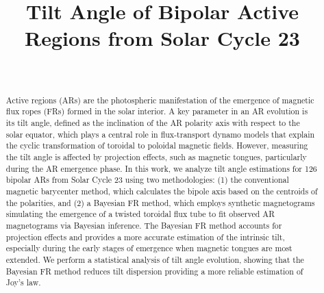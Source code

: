\documentclass[namedreferences,hyperref,optionalrh]{spr-sola}
\begin{document}
\begin{frontmatter}
\title{Tilt Angle of Bipolar Active Regions from Solar Cycle 23}

\author[addressref={aff1},email={mpoisson@iafe.uba.ar}]{~}
\address[id=aff1]{Instituto de Astronomía y Física del Espacio, CONICET-UBA,CABA, Argentina.}


\begin{abstract}

Active regions (ARs) are the photospheric manifestation of the emergence of magnetic flux ropes (FRs) formed in the solar interior. A key parameter in an AR evolution is its tilt angle, defined as the inclination of the AR polarity axis with respect to the solar equator, which plays a central role in flux-transport dynamo models that explain the cyclic transformation of toroidal to poloidal magnetic fields. However, measuring the tilt angle is affected by projection effects, such as magnetic tongues, particularly during the AR emergence phase.
In this work, we analyze tilt angle estimations for 126 bipolar ARs from Solar Cycle 23 using two methodologies: (1) the conventional magnetic barycenter method, which calculates the bipole axis based on the centroids of the polarities, and (2) a Bayesian FR method, which employs synthetic magnetograms simulating the emergence of a twisted toroidal flux tube to fit observed AR magnetograms via Bayesian inference. The Bayesian FR method accounts for projection effects and provides a more accurate estimation of the intrinsic tilt, especially during the early stages of emergence {when magnetic tongues are most extended}.
We perform a statistical analysis of tilt angle evolution, showing that the Bayesian FR method reduces tilt dispersion providing a more reliable estimation of Joy’s law. 

\end{abstract}
\end{frontmatter}
\end{document}
